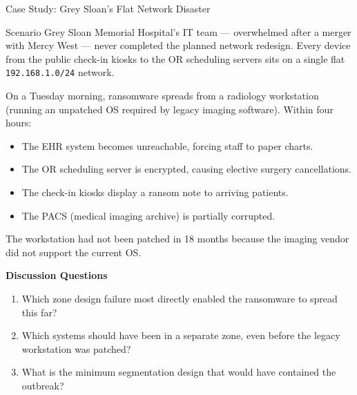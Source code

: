 \documentclass[aspectratio=169]{beamer}  %
\begin{document}
\begin{frame}{Case Study: Grey Sloan's Flat Network Disaster}
    \begin{block}{Scenario}
        \scriptsize
        Grey Sloan Memorial Hospital's IT team --- overwhelmed after a merger with Mercy West --- never completed the planned network redesign. Every device from the public check-in kiosks to the OR scheduling servers sits on a single flat \texttt{192.168.1.0/24} network.

        On a Tuesday morning, ransomware spreads from a radiology workstation (running an unpatched OS required by legacy imaging software). Within four hours:
        \begin{itemize}\setlength{\itemsep}{1pt}
            \item The EHR system becomes unreachable, forcing staff to paper charts.
            \item The OR scheduling server is encrypted, causing elective surgery cancellations.
            \item The check-in kiosks display a ransom note to arriving patients.
            \item The PACS (medical imaging archive) is partially corrupted.
        \end{itemize}
        The workstation had not been patched in 18 months because the imaging vendor did not support the current OS.
    \end{block}
    \scriptsize
    \textbf{Discussion Questions}
    \begin{enumerate}\setlength{\itemsep}{1pt}
        \item Which zone design failure most directly enabled the ransomware to spread this far?
        \item Which systems should have been in a separate zone, even before the legacy workstation was patched?
        \item What is the minimum segmentation design that would have contained the outbreak?
    \end{enumerate}
\end{frame}
\end{document}
